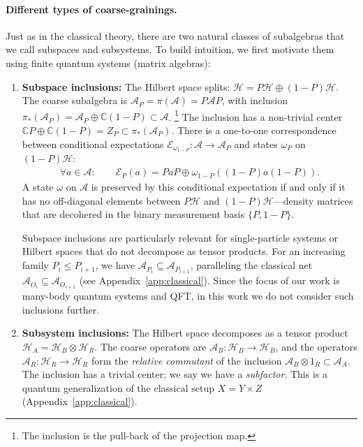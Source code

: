\documentclass[a4paper,11pt]{article}
\theoremstyle{definition}
\theoremstyle{remark}
\newcommand{\mA}{\mathcal{A}}
\newcommand{\mH}{\mathcal{H}}
\newcommand{\mE}{\mathcal{E}}
\begin{document}
\paragraph{Different types of coarse-grainings.}
Just as in the classical theory, there are two natural classes of subalgebras that we
call subspaces and subsystems.  To build intuition, we first motivate them using finite
quantum systems (matrix algebras):
\begin{enumerate}
    \item \textbf{Subspace inclusions:} The Hilbert space splits:
    $\mH=P\mH\oplus(1-P)\mH$.  The coarse subalgebra is
    $\mA_P=\pi(\mA)=P\mA P$, with inclusion
    $\pi_*(\mA_P)=\mA_P\oplus \mathbb{C}(1-P)\subset \mA$.%
    \footnote{The inclusion is the pull-back of the projection map.}
    The inclusion has a non-trivial center $\mathbb{C}P\oplus \mathbb{C}(1-P)=Z_P\subset \pi_*(\mA_P)$.
    There is a one-to-one correspondence between conditional expectations
    $\mE_{\omega_{1-P}}:\mA\to \mA_P$ and states $\omega_P$ on $(1-P)\mH$:
    \begin{align}
    \forall a\in \mA:\qquad \mE_P(a)=Pa P\oplus \omega_{1-P}((1-P)a(1-P)).
    \end{align}
    A state $\omega$ on $\mA$ is preserved by this conditional expectation if and only
    if it has no off-diagonal elements between $P\mH$ and $(1-P)\mH$—density matrices
    that are decohered in the binary measurement basis $\{P,1-P\}$.
 
    Subspace inclusions are particularly relevant for single-particle systems or
    Hilbert spaces that do not decompose as tensor products.  For an increasing family
    $P_i\leq P_{i+1}$, we have $\mathcal{A}_{P_i}\subseteq\mathcal{A}_{P_{i+1}}$,
    paralleling the classical net $\mathcal{A}_{O_i}\subseteq\mathcal{A}_{O_{i+1}}$
    (see Appendix~\ref{app:classical}).  Since the focus of our work is many-body
    quantum systems and QFT, in this work we do not consider such inclusions further.
 
    \item \textbf{Subsystem inclusions:} The Hilbert space decomposes as a tensor
    product $\mH_A=\mH_B\otimes \mH_R$.  The coarse operators are
    $\mA_B:\mH_B\to \mH_B$, and the operators $\mA_R:\mH_R\to \mH_R$ form the
    \emph{relative commutant} of the inclusion $\mA_B\otimes 1_R\subset \mA_A$.  The
    inclusion has a trivial center; we say we have a \emph{subfactor}.  This is a
    quantum generalization of the classical setup $X=Y\times Z$
    (Appendix~\ref{app:classical}).
 

\end{enumerate}
\end{document}

